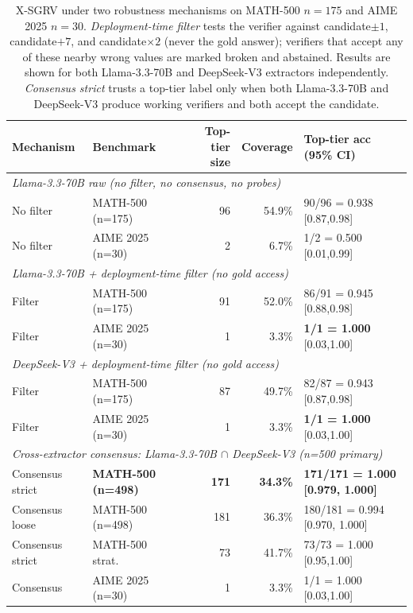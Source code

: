 \documentclass{article}
\begin{document}
\begin{table}[t]
\centering
\caption{X-SGRV under two robustness mechanisms on MATH-500 $n{=}175$ and AIME 2025 $n{=}30$. \emph{Deployment-time filter} tests the verifier against candidate$\pm 1$, candidate$+ 7$, and candidate$\times 2$ (never the gold answer); verifiers that accept any of these nearby wrong values are marked broken and abstained. Results are shown for both Llama-3.3-70B and DeepSeek-V3 extractors independently. \emph{Consensus strict} trusts a top-tier label only when both Llama-3.3-70B and DeepSeek-V3 produce working verifiers and both accept the candidate.}
\label{tab:xsgrv-robust}
\small
\begin{tabular}{llrrl}
\toprule
Mechanism & Benchmark & Top-tier size & Coverage & Top-tier acc (95\% CI) \\
\midrule
\multicolumn{5}{l}{\emph{Llama-3.3-70B raw (no filter, no consensus, no probes)}}\\
No filter & MATH-500 (n=175) & 96 & 54.9\% & 90/96 = 0.938 [0.87,0.98] \\
No filter & AIME 2025 (n=30) & 2 & 6.7\% & 1/2 = 0.500 [0.01,0.99] \\
\midrule
\multicolumn{5}{l}{\emph{Llama-3.3-70B + deployment-time filter (no gold access)}}\\
Filter & MATH-500 (n=175) & 91 & 52.0\% & 86/91 = 0.945 [0.88,0.98] \\
Filter & AIME 2025 (n=30) & 1 & 3.3\% & \textbf{1/1 = 1.000} [0.03,1.00] \\
\midrule
\multicolumn{5}{l}{\emph{DeepSeek-V3 + deployment-time filter (no gold access)}}\\
Filter & MATH-500 (n=175) & 87 & 49.7\% & 82/87 = 0.943 [0.87,0.98] \\
Filter & AIME 2025 (n=30) & 1 & 3.3\% & \textbf{1/1 = 1.000} [0.03,1.00] \\
\midrule
\multicolumn{5}{l}{\emph{Cross-extractor consensus: Llama-3.3-70B $\cap$ DeepSeek-V3 (n=500 primary)}}\\
Consensus strict & \textbf{MATH-500 (n=498)} & \textbf{171} & \textbf{34.3\%} & \textbf{171/171 = 1.000 [0.979, 1.000]} \\
Consensus loose  & MATH-500 (n=498) & 181 & 36.3\% & 180/181 = 0.994 [0.970, 1.000] \\
Consensus strict & MATH-500 strat. & 73 & 41.7\% & 73/73 = 1.000 [0.95,1.00] \\
Consensus & AIME 2025 (n=30) & 1 & 3.3\% & 1/1 = 1.000 [0.03,1.00] \\
\bottomrule
\end{tabular}
\end{table}
\end{document}
